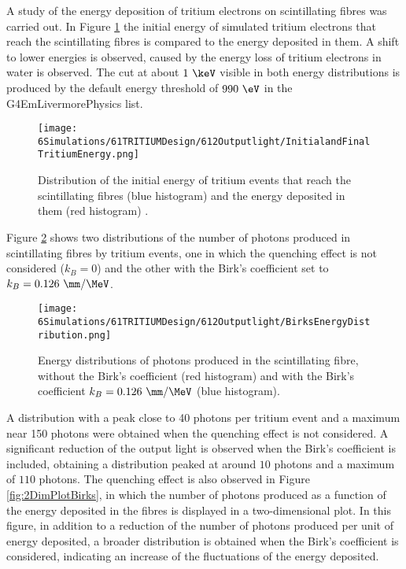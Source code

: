 A study of the energy deposition of tritium electrons on scintillating fibres was carried out. In Figure \ref{fig:InitialFinalTritiumEnergy} the initial energy of simulated tritium electrons that reach the scintillating fibres is compared to the energy deposited in them. A shift to lower energies is observed, caused by the energy loss of tritium electrons in water is observed. The cut at about $1~\keV$ visible in both energy distributions is produced by the default energy threshold of $990~\eV$ in the G4EmLivermorePhysics list.
\begin{figure}[h]
\centering
\texttt{[image: 6Simulations/61TRITIUMDesign/612Outputlight/InitialandFinalTritiumEnergy.png]}
\caption{Distribution of the initial energy of tritium events that reach the scintillating fibres (blue histogram) and the energy deposited in them (red histogram) \cite{SimulationPaperCarlos}.\label{fig:InitialFinalTritiumEnergy}}
\end{figure}
Figure \ref{fig:BirksEffectinEnergyDistribution} shows two distributions of the number of photons produced in scintillating fibres by tritium events, one in which the quenching effect is not considered ($k_B=0$) and the other with the Birk's coefficient set to $k_B=0.126~\mm/\MeV$.
\begin{figure}[h]
\centering
\texttt{[image: 6Simulations/61TRITIUMDesign/612Outputlight/BirksEnergyDistribution.png]}
\caption{Energy distributions of photons produced in the scintillating fibre, without the Birk's coefficient (red histogram) and with the Birk's coefficient $k_B=0.126~\mm/\MeV$ (blue histogram)\cite{SimulationPaperCarlos}.\label{fig:BirksEffectinEnergyDistribution}}
\end{figure}  
A distribution with a peak close to 40 photons per tritium event and a maximum near 150 photons were obtained when the quenching effect is not considered. A significant reduction of the output light is observed when the Birk's coefficient is included, obtaining a distribution peaked at around $10$ photons and a maximum of $110$ photons. The quenching effect is also observed in Figure \ref{fig:2DimPlotBirks}, in which the number of photons produced  as a function of the energy deposited in the fibres is displayed in a two-dimensional plot. In this figure, in addition to a reduction of the number of photons produced per unit of energy deposited, a broader distribution is obtained when the Birk's coefficient is considered, indicating an increase of the fluctuations of the energy deposited.

